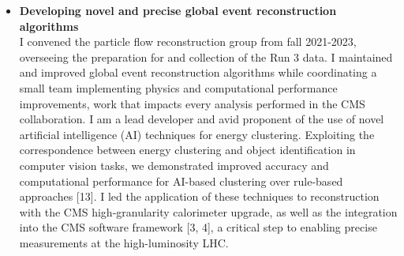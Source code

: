 \documentclass[10pt]{res} %
\begin{document}
\begin{resume}
\begin{itemize}
  \item\textbf{Developing novel and precise global event reconstruction algorithms} \\
    I convened the particle flow reconstruction group from fall 2021-2023, overseeing the preparation for and collection of the Run 3 data.
    I maintained and improved global event reconstruction algorithms while coordinating a small team implementing physics 
    and computational performance improvements, work that impacts every analysis performed in the CMS collaboration. 
    I am a lead developer and avid proponent of 
    the use of novel artificial intelligence (AI) techniques for energy clustering. Exploiting the correspondence
    between energy clustering and object identification in computer vision tasks, we demonstrated improved accuracy and computational 
    performance for AI-based clustering over rule-based approaches [13]. I led the application
    of these techniques to reconstruction with the CMS high-granularity calorimeter upgrade,
    as well as the integration into the CMS software framework [3, 4], a critical step to enabling
    precise measurements at the high-luminosity LHC.

\end{itemize}


\end{resume}
\end{document}
